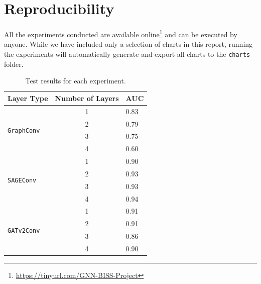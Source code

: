 \documentclass[11pt]{article}
\begin{document}
\section{Reproducibility}
All the experiments conducted are available 
%
online\footnote{\url{https://tinyurl.com/GNN-BISS-Project}} 
%
and can be executed by anyone. 
%
While we have included only a selection of charts in this report, running the 
%
experiments will automatically generate and export all charts to the \texttt{charts} folder.

\begin{table}
  \centering
  \begin{tabular}{|l|c|l|} 
  \hline
  \textbf{Layer Type}                  & \multicolumn{1}{l|}{\textbf{Number of Layers}} & \textbf{AUC}  \\ 
  \hline
  \multirow{4}{*}{\texttt{GraphConv }} & 1                                              & 0.83          \\ 
  \cline{2-3}
                                       & 2                                              & 0.79          \\ 
  \cline{2-3}
                                       & 3                                              & 0.75          \\ 
  \cline{2-3}
                                       & 4                                              & 0.60          \\ 
  \hline
  \multirow{4}{*}{\texttt{SAGEConv}}   & 1                                              & 0.90          \\ 
  \cline{2-3}
                                       & 2                                              & 0.93          \\ 
  \cline{2-3}
                                       & 3                                              & 0.93          \\ 
  \cline{2-3}
                                       & 4                                              & 0.94          \\ 
  \hline
  \multirow{4}{*}{\texttt{GATv2Conv}}  & 1                                              & 0.91          \\ 
  \cline{2-3}
                                       & 2                                              & 0.91          \\ 
  \cline{2-3}
                                       & 3                                              & 0.86          \\ 
  \cline{2-3}
                                       & 4                                              & 0.90          \\
  \hline
  \end{tabular}

  \caption{Test results for each experiment.}
  \label{tab:results}
\end{table}







\end{document}
